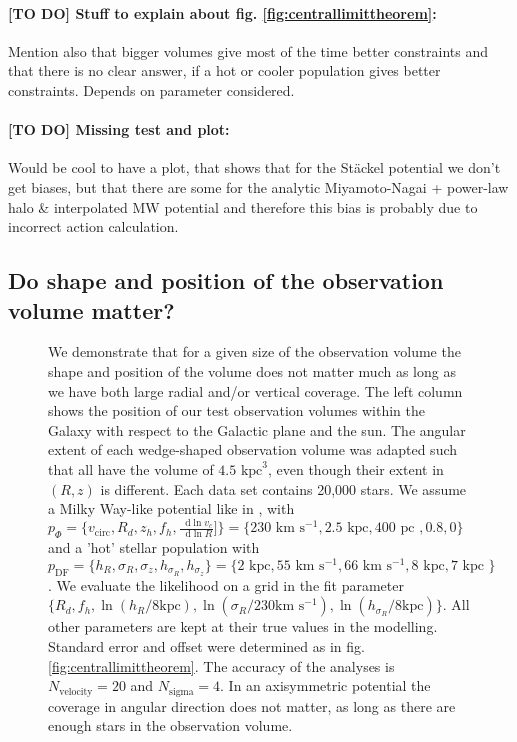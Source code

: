 \documentclass[12pt,preprint]{aastex}
\newcommand*\diff{\mathop{}\!\mathrm{d}}
\begin{document}
 \paragraph{[TO DO] Stuff to explain about fig. \ref{fig:centrallimittheorem}:} Mention also that bigger volumes give most of the time better constraints and that there is no clear answer, if a hot or cooler population gives better constraints. Depends on parameter considered.


\paragraph{[TO DO] Missing test and plot:}  Would be cool to have a plot, that shows that for the St\"ackel potential we don't get biases, but that there are some for the analytic Miyamoto-Nagai + power-law halo \& interpolated MW potential and therefore this bias is probably due to incorrect action calculation.


\subsection{Do shape and position of the observation volume matter?}



\begin{figure}
\caption{We demonstrate that for a given size of the observation volume the shape and position of the volume does not matter much as long as we have both large radial and/or vertical coverage. The left column shows the position of our test observation volumes within the Galaxy with respect to the Galactic plane and the sun. The angular extent of each wedge-shaped observation volume was adapted such that all have the volume of $4.5 \text{ kpc}^3$, even though their extent in $(R,z)$ is different. Each data set contains 20,000 stars. We assume a Milky Way-like potential like in \citet{bo13}, with  $p_\Phi = \{v_\text{circ},R_d,z_h,f_h,\frac{\diff\ln v_c}{\diff\ln R}] \}=\{230 \text{ km s$^{-1}$},2.5\text{ kpc},400 \text{ pc }, 0.8,0\}$ and a 'hot' stellar population with $p_\text{DF} = \{ h_R, \sigma_R, \sigma_z,h_{\sigma_R},h_{\sigma_z}\} =\{2 \text{ kpc}, 55 \text{ km s$^{-1}$}, 66 \text{ km s$^{-1}$}, 8 \text{ kpc}, 7 \text{ kpc }\} $. We evaluate the likelihood on a grid in the fit parameter $\{R_d,f_h,\ln(h_R/8\text{kpc}),\ln(\sigma_{R}/230 \text{km s$^{-1}$}),\ln(h_{\sigma_R}/8\text{kpc}) \}$. All other parameters are kept at their true values in the modelling. Standard error and offset were determined as in fig. \ref{fig:centrallimittheorem}. The accuracy of the analyses is $N_\text{velocity} = 20$ and $N_\text{sigma} = 4$. In an axisymmetric potential the coverage in angular direction does not matter, as long as there are enough stars in the observation volume.}
\label{fig:obsvolumetest}
\end{figure}
\end{document}
